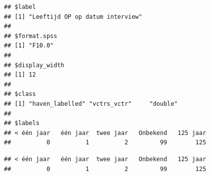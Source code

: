 \documentclass[
]{book}
\newenvironment{Shaded}{\begin{snugshade}}{\end{snugshade}}
\newcommand{\CommentTok}[1]{\textcolor[rgb]{0.56,0.35,0.01}{\textit{#1}}}
\newcommand{\KeywordTok}[1]{\textcolor[rgb]{0.13,0.29,0.53}{\textbf{#1}}}
\newcommand{\NormalTok}[1]{#1}
\newcommand{\OperatorTok}[1]{\textcolor[rgb]{0.81,0.36,0.00}{\textbf{#1}}}
\newcommand{\StringTok}[1]{\textcolor[rgb]{0.31,0.60,0.02}{#1}}
\begin{document}
\begin{verbatim}
## $label
## [1] "Leeftijd OP op datum interview"
## 
## $format.spss
## [1] "F10.0"
## 
## $display_width
## [1] 12
## 
## $class
## [1] "haven_labelled" "vctrs_vctr"     "double"        
## 
## $labels
## < één jaar   één jaar  twee jaar   Onbekend   125 jaar 
##          0          1          2         99        125
\end{verbatim}

\begin{Shaded}
\end{Shaded}

\begin{verbatim}
## < één jaar   één jaar  twee jaar   Onbekend   125 jaar 
##          0          1          2         99        125
\end{verbatim}

\begin{Shaded}
\end{Shaded}
\end{document}
